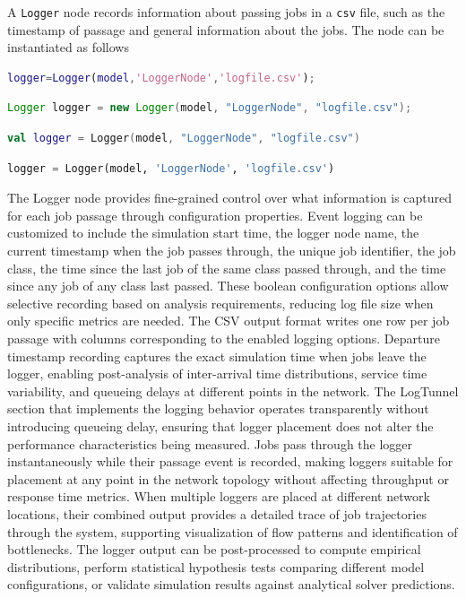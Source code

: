 A \texttt{Logger} node records information about passing jobs in a \texttt{csv} file, such as the timestamp of passage and general information about the jobs. The node can be instantiated as follows
\begin{MATLAB}
\begin{lstlisting}[language = matlab]
logger=Logger(model,'LoggerNode','logfile.csv');
\end{lstlisting}
\end{MATLAB}
\begin{JAVA}
\begin{lstlisting}[language=java, basicstyle=\ttfamily\scriptsize]
Logger logger = new Logger(model, "LoggerNode", "logfile.csv");
\end{lstlisting}
\end{JAVA}
\begin{KOTLIN}
\begin{lstlisting}[language=kotlin, basicstyle=\ttfamily\scriptsize]
val logger = Logger(model, "LoggerNode", "logfile.csv")
\end{lstlisting}
\end{KOTLIN}
\begin{PYTHON}
\begin{lstlisting}[language=python]
logger = Logger(model, 'LoggerNode', 'logfile.csv')
\end{lstlisting}
\end{PYTHON}

The Logger node provides fine-grained control over what information is captured for each job passage through configuration properties. Event logging can be customized to include the simulation start time, the logger node name, the current timestamp when the job passes through, the unique job identifier, the job class, the time since the last job of the same class passed through, and the time since any job of any class last passed. These boolean configuration options allow selective recording based on analysis requirements, reducing log file size when only specific metrics are needed. The CSV output format writes one row per job passage with columns corresponding to the enabled logging options. Departure timestamp recording captures the exact simulation time when jobs leave the logger, enabling post-analysis of inter-arrival time distributions, service time variability, and queueing delays at different points in the network. The LogTunnel section that implements the logging behavior operates transparently without introducing queueing delay, ensuring that logger placement does not alter the performance characteristics being measured. Jobs pass through the logger instantaneously while their passage event is recorded, making loggers suitable for placement at any point in the network topology without affecting throughput or response time metrics. When multiple loggers are placed at different network locations, their combined output provides a detailed trace of job trajectories through the system, supporting visualization of flow patterns and identification of bottlenecks. The logger output can be post-processed to compute empirical distributions, perform statistical hypothesis tests comparing different model configurations, or validate simulation results against analytical solver predictions.

